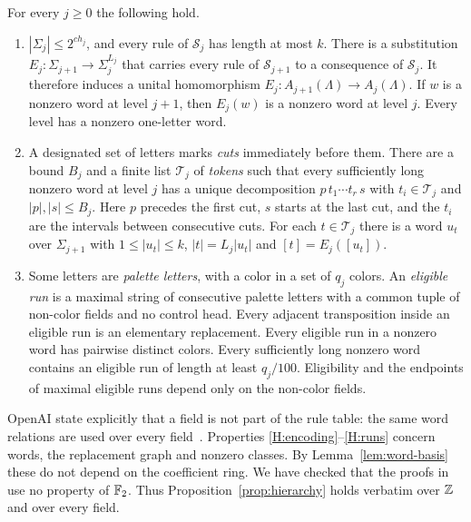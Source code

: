 \begin{proposition}\label{prop:hierarchy}
For every $j\geq0$ the following hold.
\begin{enumerate}[label=\textup{(H\arabic*)}]
\item\label{H:encoding} $|\Sigma_j|\leq2^{ch_j}$, and every rule of $\mathcal S_j$ has length at most $k$. There is a
  substitution $E_j:\Sigma_{j+1}\to\Sigma_j^{L_j}$ that carries every rule of $\mathcal S_{j+1}$ to a consequence of
  $\mathcal S_j$. It therefore induces a unital homomorphism $E_j:A_{j+1}(\Lambda)\to A_j(\Lambda)$. If $w$ is a nonzero
  word at level $j+1$, then $E_j(w)$ is a nonzero word at level $j$. Every level has a nonzero one-letter word.
\item\label{H:tokens} A designated set of letters marks \emph{cuts} immediately before them. There are a bound $B_j$ and a
  finite list $\mathcal T_j$ of \emph{tokens} such that every sufficiently long nonzero word at level $j$ has a unique
  decomposition $p\,t_1\cdots t_r\,s$ with $t_i\in\mathcal T_j$ and $|p|,|s|\leq B_j$. Here $p$ precedes the first cut, $s$
  starts at the last cut, and the $t_i$ are the intervals between consecutive cuts. For each $t\in\mathcal T_j$ there is a
  word $u_t$ over $\Sigma_{j+1}$ with $1\leq|u_t|\leq k$, $|t|=L_j|u_t|$ and $[t]=E_j([u_t])$.
\item\label{H:runs} Some letters are \emph{palette letters}, with a color in a set of $q_j$ colors. An \emph{eligible run}
  is a maximal string of consecutive palette letters with a common tuple of non-color fields and no control head. Every
  adjacent transposition inside an eligible run is an elementary replacement. Every eligible run in a nonzero word has
  pairwise distinct colors. Every sufficiently long nonzero word contains an eligible run of length at least $q_j/100$.
  Eligibility and the endpoints of maximal eligible runs depend only on the non-color fields.
\end{enumerate}
\end{proposition}

\begin{remark}\label{rem:char-free}
OpenAI state explicitly that a field is not part of the rule table: the same word relations are used over every
field~\cite[Section~2]{OAI247periodic}. Properties \ref{H:encoding}--\ref{H:runs} concern words, the replacement graph
and nonzero classes. By Lemma~\ref{lem:word-basis} these do not depend on the coefficient ring. We have checked that the
proofs in \cite[Section~2]{OAI247periodic} use no property of $\mathbb F_2$. Thus Proposition~\ref{prop:hierarchy} holds verbatim
over $\mathbb Z$ and over every field.
\end{remark}

